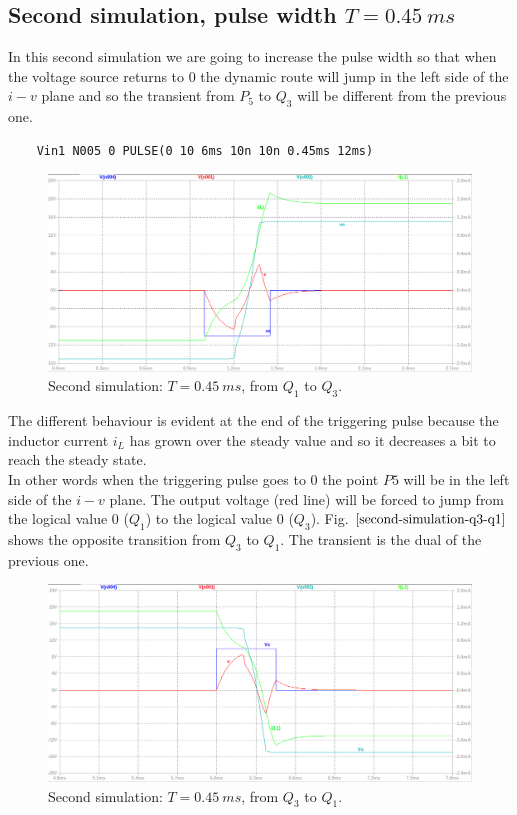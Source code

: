 \documentclass[12pt,a4paper,tweside,onehalfspacing]{article}
\begin{document}
\subsection{Second simulation, pulse width \texorpdfstring{$T=0.45\ ms$}{}}
In this second simulation we are going to increase the pulse width so that when the voltage source returns to $0$ the dynamic route will jump in the left side of the $i-v$ plane and so the transient from $P_5$ to $Q_3$ will be different from the previous one.
%
\begin{verbatim}
    Vin1 N005 0 PULSE(0 10 6ms 10n 10n 0.45ms 12ms)
\end{verbatim}
\begin{figure}[!ht]
        \centering \includegraphics[width=0.8\columnwidth]{second-simulation-Q1-Q3.png}
        \caption{\label{second-simulation-q1-q3}Second simulation: $T=0.45\ ms$, from $Q_1$ to $Q_3$.
        }
\end{figure}
The different behaviour is evident at the end of the triggering pulse because the inductor current $i_L$ has grown over the steady value and so it decreases a bit to reach the steady state.\\
In other words when the triggering pulse goes to $0$ the point $P5$ will be in the left side of the $i-v$ plane. The output voltage (red line) will be forced to jump from the logical value $0$ ($Q_1$) to the logical value $0$ ($Q_3$). Fig. $\ref{second-simulation-q3-q1}$ shows the opposite transition from $Q_3$ to $Q_1$. The transient is the dual of the previous one.
\begin{figure}[!ht]
        \centering \includegraphics[width=0.8\columnwidth]{second-simulation-Q3-Q1.png}
        \caption{\label{second-simulation-q3-q1}Second simulation: $T=0.45\ ms$, from $Q_3$ to $Q_1$.
        }
\end{figure}
%
\clearpage
%
\newpage
%
\end{document}
